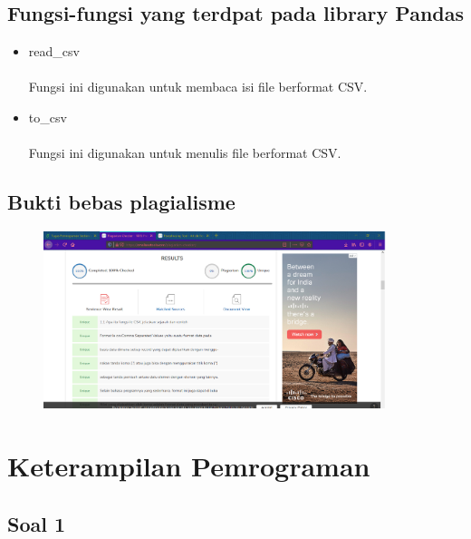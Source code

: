 \documentclass{article}
\begin{document}
    \subsection{Fungsi-fungsi yang terdpat pada library Pandas}
        \begin{itemize}
            \item read\_csv
                \paragraph{} Fungsi ini digunakan untuk membaca isi file berformat CSV.
                
            \item to\_csv
                \paragraph{} Fungsi ini digunakan untuk menulis file berformat CSV.
                
        \end{itemize}
    \newpage
    \subsection{Bukti bebas plagialisme}
        \begin{figure}[ht]
            \centerline{\includegraphics[width=10cm]{Capture2.PNG}}
        \end{figure}
    
\section{Keterampilan Pemrograman}
    \subsection*{Soal 1}
\end{document}
